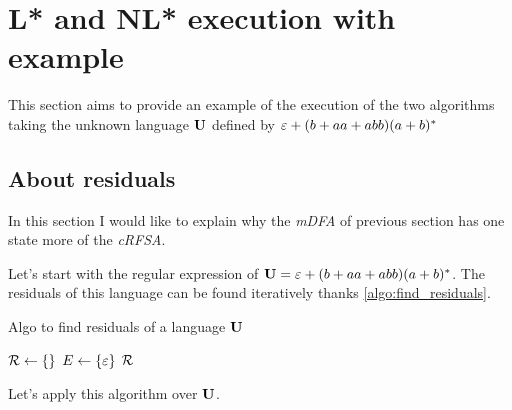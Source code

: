 \section{L* and NL* execution with example}

This section aims to provide an example of the execution of the two algorithms taking the unknown language $\U$ defined by $\varepsilon+(b+aa+abb)(a+b)^*$ %



\subsection{About residuals}
In this section I would like to explain why the \textit{mDFA} of previous section has one state more of the \textit{cRFSA}.

Let's start with the regular expression of $\mathbf{U} = \varepsilon+(b+aa+abb)(a+b)^*$. The residuals of this language can be found iteratively thanks \cref{algo:find_residuals}.


\begin{algorithm}[H]
  \caption{Algo to find residuals of a language $\U$}
  \label{algo:find_residuals}
  \KwIn{$\U$, $\Sigma$}
  $\mathcal{R} \gets \{\}$ 
  $E \gets \{\varepsilon\}$
  \Return $\mathcal{R}$
\end{algorithm}

Let's apply this algorithm over $\U$.

\newcommand{\EM}{\varnothing}

